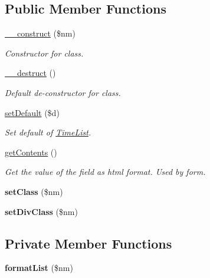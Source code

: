 \subsection*{Public Member Functions}
\begin{DoxyCompactItemize}
\item 
\hyperlink{class_time_list_ac610fc08cbb0781b26136636de129bc0}{\-\_\-\-\_\-construct} (\$nm)
\begin{DoxyCompactList}\small\item\em Constructor for class. \end{DoxyCompactList}\item 
\hypertarget{class_time_list_a421831a265621325e1fdd19aace0c758}{\hyperlink{class_time_list_a421831a265621325e1fdd19aace0c758}{\-\_\-\-\_\-destruct} ()}\label{class_time_list_a421831a265621325e1fdd19aace0c758}

\begin{DoxyCompactList}\small\item\em Default de-\/constructor for class. \end{DoxyCompactList}\item 
\hyperlink{class_time_list_aaf2bb7deba74bb0f994044954bd74ff3}{set\-Default} (\$d)
\begin{DoxyCompactList}\small\item\em Set default of \hyperlink{class_time_list}{Time\-List}. \end{DoxyCompactList}\item 
\hyperlink{class_time_list_a14814e04b348120748912692645f3a75}{get\-Contents} ()
\begin{DoxyCompactList}\small\item\em Get the value of the field as html format. Used by form. \end{DoxyCompactList}\item 
\hypertarget{class_time_list_a6f75ffe7d98c9e375394d63f8d379b2d}{{\bfseries set\-Class} (\$nm)}\label{class_time_list_a6f75ffe7d98c9e375394d63f8d379b2d}

\item 
\hypertarget{class_time_list_a4e25c00802ca9e9afb52a9177014fea7}{{\bfseries set\-Div\-Class} (\$nm)}\label{class_time_list_a4e25c00802ca9e9afb52a9177014fea7}

\end{DoxyCompactItemize}
\subsection*{Private Member Functions}
\begin{DoxyCompactItemize}
\item 
\hypertarget{class_time_list_adb57b56db9f1cbbe4e72ed05e2d5bd8a}{{\bfseries format\-List} (\$nm)}\label{class_time_list_adb57b56db9f1cbbe4e72ed05e2d5bd8a}

\end{DoxyCompactItemize}
